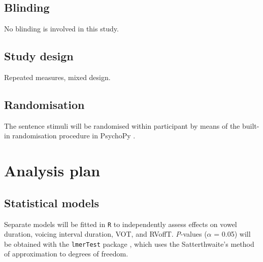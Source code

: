 \documentclass[11pt,]{article}
\begin{document}
\hypertarget{blinding}{%
\subsection{Blinding}\label{blinding}}

No blinding is involved in this study.

\hypertarget{study-design}{%
\subsection{Study design}\label{study-design}}

Repeated measures, mixed design.

\hypertarget{randomisation}{%
\subsection{Randomisation}\label{randomisation}}

The sentence stimuli will be randomised within participant by means of
the built-in randomisation procedure in PsychoPy \citep{peirce2009}.

\hypertarget{analysis-plan}{%
\section{Analysis plan}\label{analysis-plan}}

\hypertarget{statistical-models}{%
\subsection{Statistical models}\label{statistical-models}}

\label{s:stats}

Separate models will be fitted in \texttt{R} \citep{r-core-team2018} to
independently assess effects on vowel duration, voicing interval
duration, VOT, and RVoffT. \emph{P}-values (\(\alpha\) = 0.05) will be
obtained with the \texttt{lmerTest} package \citep{kuznetsova2017},
which uses the Satterthwaite's method of approximation to degrees of
freedom.
\end{document}
